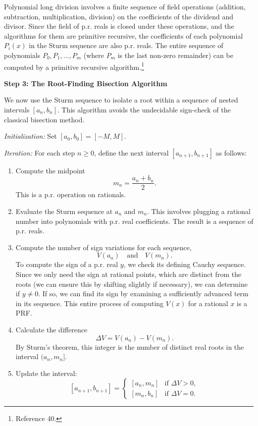 \documentclass[12pt, a4paper]{article}
\begin{document}
Polynomial long division involves a finite sequence of field operations (addition, subtraction, multiplication, division) on the coefficients of the dividend and divisor. Since the field of p.r. reals is closed under these operations, and the algorithms for them are primitive recursive, the coefficients of each polynomial $P_i(x)$ in the Sturm sequence are also p.r. reals. The entire sequence of polynomials $P_0, P_1, \ldots, P_m$ (where $P_m$ is the last non-zero remainder) can be computed by a primitive recursive algorithm.\footnote{Reference 40.}

\medskip

\textbf{Step 3: The Root-Finding Bisection Algorithm}

We now use the Sturm sequence to isolate a root within a sequence of nested intervals $[a_n, b_n]$. This algorithm avoids the undecidable sign-check of the classical bisection method.

\textit{Initialization:} Set $[a_0, b_0] = [-M, M]$.

\textit{Iteration:} For each step $n \geq 0$, define the next interval $[a_{n+1}, b_{n+1}]$ as follows:

\begin{enumerate}
    \item Compute the midpoint
    \[
    m_n = \frac{a_n + b_n}{2}.
    \]
    This is a p.r. operation on rationals.
    
    \item Evaluate the Sturm sequence at $a_n$ and $m_n$. This involves plugging a rational number into polynomials with p.r. real coefficients. The result is a sequence of p.r. reals.
    
    \item Compute the number of sign variations for each sequence,
    \[
    V(a_n) \quad \text{and} \quad V(m_n).
    \]
    To compute the sign of a p.r. real $y$, we check its defining Cauchy sequence. Since we only need the sign at rational points, which are distinct from the roots (we can ensure this by shifting slightly if necessary), we can determine if $y \neq 0$. If so, we can find its sign by examining a sufficiently advanced term in its sequence. This entire process of computing $V(x)$ for a rational $x$ is a PRF.
    
    \item Calculate the difference 
    \[
    \Delta V = V(a_n) - V(m_n).
    \]
    By Sturm's theorem, this integer is the number of distinct real roots in the interval $(a_n, m_n]$.
    
    \item Update the interval:
    \[
    [a_{n+1}, b_{n+1}] = \begin{cases}
        [a_n, m_n] & \text{if } \Delta V > 0, \\
        [m_n, b_n] & \text{if } \Delta V = 0.
    \end{cases}
    \]
\end{enumerate}
\end{document}
